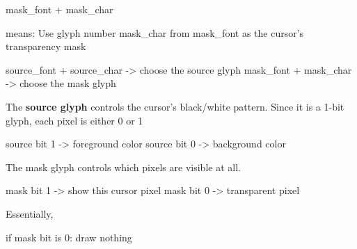 \documentclass{report}
\begin{document}
\begin{itemize}
\begin{cppcode}
            mask_font + mask_char
            \end{cppcode}
            \bigbreak \noindent 
            means: Use glyph number mask\_char from mask\_font as the cursor’s transparency mask
            \bigbreak \noindent 
            \begin{cppcode}
                source_font + source_char  -> choose the source glyph
                mask_font   + mask_char    -> choose the mask glyph
            \end{cppcode}
            \bigbreak \noindent 
            The \textbf{source glyph} controls the cursor’s black/white pattern. Since it is a 1-bit glyph, each pixel is either 0 or 1
            \bigbreak \noindent 
            \begin{cppcode}
                source bit 1 -> foreground color
                source bit 0 -> background color
            \end{cppcode}
            \bigbreak \noindent 
            The mask glyph controls which pixels are visible at all.
            \bigbreak \noindent 
            \begin{cppcode}
                mask bit 1 -> show this cursor pixel
                mask bit 0 -> transparent pixel
            \end{cppcode}
            \bigbreak \noindent 
            Essentially,
            \bigbreak \noindent 
            \begin{cppcode}
                if mask bit is 0:
                    draw nothing


\end{cppcode}
\end{itemize}
\end{document}
